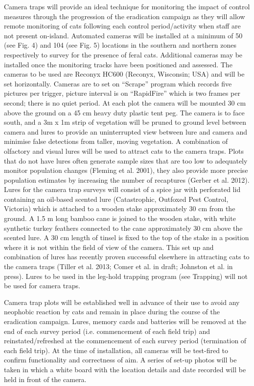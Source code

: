 \documentclass[version=last,
    paper=a4,                               %
    10pt,                                   %
    dvipsnames,
    oneside,                              %
    headings=openany,                       %
    open=any,
    BCOR=7mm,                               %
    DIV=15,     %
]{scrbook}
\begin{document}
Camera traps will provide an ideal technique for monitoring the impact
of control measures through the progression of the eradication campaign
as they will allow remote monitoring of cats following each control
period/activity when staff are not present on-island. Automated cameras
will be installed at a minimum of 50 (see Fig. 4) and 104 (see Fig. 5)
locations in the southern and northern zones respectively to survey for
the presence of feral cats. Additional cameras may be installed once the
monitoring tracks have been positioned and assessed. The cameras to be
used are Reconyx HC600 (Reconyx, Wisconsin; USA) and will be set
horizontally. Cameras are to set on ``Scrape'' program which records
five pictures per trigger, picture interval is on ``RapidFire'' which is
two frames per second; there is no quiet period. At each plot the camera
will be mounted 30 cm above the ground on a 45 cm heavy duty plastic
tent peg. The camera is to face south, and a 3m x 1m strip of vegetation
will be pruned to ground level between camera and lures to provide an
uninterrupted view between lure and camera and minimise false detections
from taller, moving vegetation. A combination of olfactory and visual
lures will be used to attract cats to the camera traps. Plots that do
not have lures often generate sample sizes that are too low to
adequately monitor population changes (Fleming et al. 2001), they also
provide more precise population estimates by increasing the number of
recaptures (Gerber et al. 2012). Lures for the camera trap surveys will
consist of a spice jar with perforated lid containing an oil-based
scented lure (Catastrophic, Outfoxed Pest Control, Victoria) which is
attached to a wooden stake approximately 30 cm from the ground. A 1.5 m
long bamboo cane is joined to the wooden stake, with white synthetic
turkey feathers connected to the cane approximately 30 cm above the
scented lure. A 30 cm length of tinsel is fixed to the top of the stake
in a position where it is not within the field of view of the camera.
This set up and combination of lures has recently proven successful
elsewhere in attracting cats to the camera traps (Tiller et al. 2013;
Comer et al. in draft; Johnston et al. in press). Lures to be used in
the leg-hold trapping program (see Trapping) will not be used for camera
traps.

Camera trap plots will be established well in advance of their use to
avoid any neophobic reaction by cats and remain in place during the
course of the eradication campaign. Lures, memory cards and batteries
will be removed at the end of each survey period (i.e. commencement of
each field trip) and reinstated/refreshed at the commencement of each
survey period (termination of each field trip). At the time of
installation, all cameras will be test-fired to confirm functionality
and correctness of aim. A series of set-up photos will be taken in which
a white board with the location details and date recorded will be held
in front of the camera.
\end{document}
